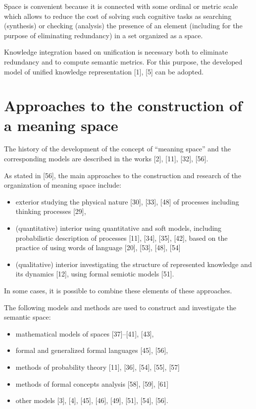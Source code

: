 \documentclass[10pt, a4paper]{article}
\begin{document}
\begin{multicols}{2}
Space is convenient because it is connected with some
ordinal or metric scale which allows to reduce the cost of
solving such cognitive tasks as searching (synthesis) or
checking (analysis) the presence of an element (including
for the purpose of eliminating redundancy) in a set
organized as a space.

Knowledge integration based on unification is necessary both to eliminate redundancy and to compute semantic metrics. For this purpose, the developed model of
unified knowledge representation [1], [5] can be adopted.

\section{Approaches to the construction of a meaning space}

The history of the development of the concept of
“meaning space” and the corresponding models are described in the works [2], [11], [32], [56].

As stated in [56], the main approaches to the construction and research of the organization of meaning space
include:

\begin{itemize}
    \item exterior studying the physical nature [30], [33], [48]
of processes including thinking processes [29],
    \item (quantitative) interior using quantitative and soft
models, including probabilistic description of processes [11], [34], [35], [42], based on the practice of using words of language [20], [53], [48], [54]
    \item (qualitative) interior investigating the structure of
represented knowledge and its dynamics [12], using
formal semiotic models [51].
\end{itemize}
\noindent In some cases, it is possible to combine these elements
of these approaches.

The following models and methods are used to construct and investigate the semantic space:
\begin{itemize}
    \item mathematical models of spaces [37]–[41], [43],
    \item formal and generalized formal languages [45], [56],
    \item methods of probability theory [11], [36], [54], [55], [57]
    \item methods of formal concepts analysis [58], [59], [61]
    \item other models [3], [4], [45], [46], [49], [51], [54], [56].
\end{itemize}


\end{multicols}
\end{document}

